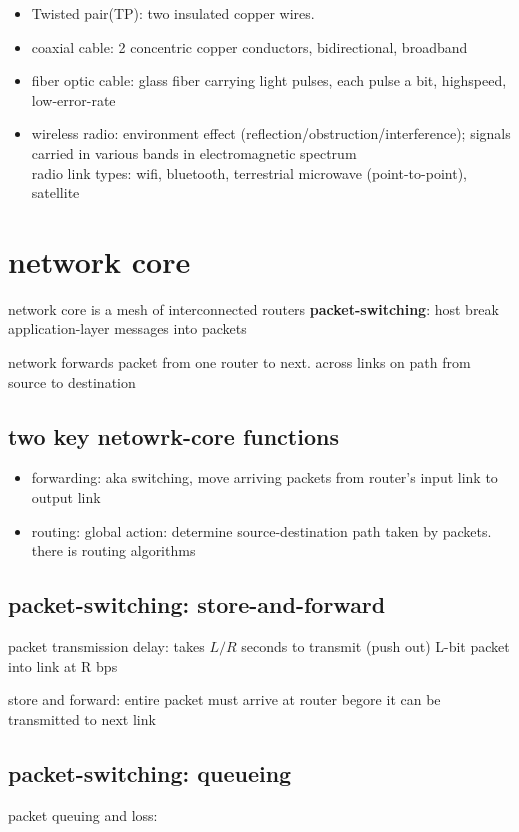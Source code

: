 \documentclass[10pt]{article}
\theoremstyle{break}
\begin{document}
\begin{itemize}
    \item Twisted pair(TP): two insulated copper wires.
    \item coaxial cable: 2 concentric copper conductors, bidirectional, broadband 
    \item fiber optic cable: glass fiber carrying light pulses, each pulse a bit, highspeed, low-error-rate 
    \item wireless radio: environment effect (reflection/obstruction/interference); signals carried in various bands in electromagnetic spectrum 
    \\radio link types: wifi, bluetooth, terrestrial microwave (point-to-point), satellite
\end{itemize}

\section{network core}
network core is a mesh of interconnected routers 
\textbf{packet-switching}: host break application-layer messages into packets 

network forwards packet from one router to next. across links on path from source to destination

\subsection{two key netowrk-core functions}
\begin{itemize}
    \item forwarding: aka switching, move arriving packets from router's input link to output link 
    \item routing: global action: determine source-destination path taken by packets. there is routing algorithms
\end{itemize}

\subsection{packet-switching: store-and-forward}
packet transmission delay: takes $L/R$ seconds to transmit (push out) L-bit packet into link at R bps 

store and forward: entire packet must arrive at router begore it can be transmitted to next link

\subsection{packet-switching: queueing}
packet queuing and loss: 
\end{document}
